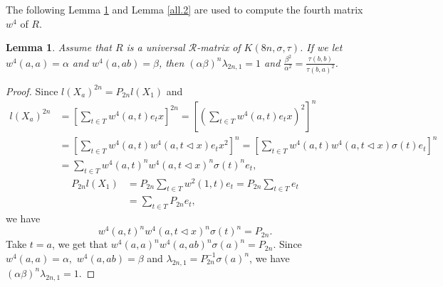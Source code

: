 \documentclass[a4paper,11pt]{amsart}
\numberwithin{equation}{section}
\newtheorem{lemma}[theorem]{Lemma}
\begin{document}
The following Lemma \ref{all.1} and Lemma \ref{all.2} are used to compute the fourth matrix $w^4$ of $R$.
\begin{lemma}\label{all.1}
Assume that $R$ is a universal $\mathcal{R}$-matrix of $K(8n,\sigma,\tau)$. If we let $w^4(a,a)=\alpha$ and $w^4(a,ab)=\beta$, then $(\alpha\beta)^n \lambda_{2n,1}=1$ and $\frac{\beta^2}{\alpha^2}=\frac{\tau(b,b)}{\tau(b,a)^2}$.
\end{lemma}
\begin{proof}
Since $l(X_a)^{2n}=P_{2n}l(X_1)$ and
\begin{align*}
l(X_a)^{2n}&=[\sum_{t\in T} w^4(a,t)e_t x]^{2n}=[(\sum_{t\in T} w^4(a,t)e_t x)^2]^n\\
&=[\sum_{t\in T} w^4(a,t) w^4(a,t\triangleleft x)e_t x^2]^n=[\sum_{t\in T} w^4(a,t) w^4(a,t\triangleleft x) \sigma(t) e_t]^n\\
&=\sum_{t\in T} w^4(a,t)^n w^4(a,t\triangleleft x)^n \sigma(t)^n e_t,
\end{align*}
\begin{align*}
P_{2n}l(X_1)&=P_{2n} \sum_{t\in T} w^2(1,t)e_t=P_{2n} \sum_{t\in T} e_t\\
&=\sum_{t\in T}P_{2n}e_t,
\end{align*}
 we have $$w^4(a,t)^n w^4(a,t\triangleleft x)^n \sigma(t)^n=P_{2n}.$$ Take $t=a$, we get that $w^4(a,a)^n w^4(a,ab)^n \sigma(a)^n=P_{2n}$. Since $w^4(a,a)=\alpha,$ $w^4(a,ab)=\beta$ and $\lambda_{2n,1}=P_{2n}^{-1} \sigma(a)^n$, we have $(\alpha\beta)^n \lambda_{2n,1}=1$.


\end{proof}
\end{document}
